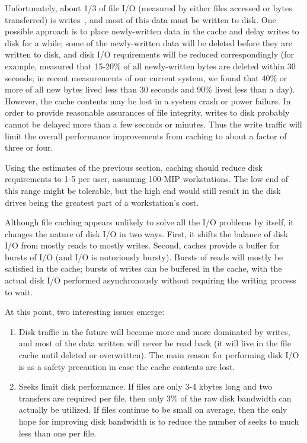 Unfortunately, about 1/3 of file I/O (measured by either files accessed
or bytes transferred) is writes~\cite{ouster:bsd}, and most of this data must
be written to disk.
One possible approach is to place
newly-written data in the cache and delay writes to disk for a while;
some of the newly-written data will be deleted before they are written
to disk, and disk I/O requirements will be reduced correspondingly (for
example, \cite{ouster:bsd} measured that 15-20\% of all newly-written bytes are
deleted within 30 seconds;  in recent measurements of our
current system, we found that 40\% or more of all new bytes lived less
than 30 seconds and 90\% lived less than a day).  However, the cache
contents may
be lost in a system crash or power failure.  In order to provide
reasonable assurances of file integrity, writes to disk probably cannot
be delayed more than a few seconds or minutes.  Thus the write traffic
will limit the overall performance improvements from caching to about
a factor of three or four.

Using the estimates of the previous section, caching should
reduce disk requirements to 1-5 per user, assuming
100-MIP workstations.  The low end of this range might be tolerable,
but the high end would still result in the disk drives being the
greatest part of a workstation's cost.

Although file caching appears unlikely to solve all the I/O
problems by itself, it changes the nature of disk I/O in two
ways.
First, it shifts the balance of disk I/O from mostly reads to mostly
writes.  Second, caches provide a buffer for bursts
of I/O (and I/O is notoriously bursty).  Bursts of reads will mostly be
satisfied in the cache;  bursts of writes can be buffered in the cache,
with the actual disk I/O performed asynchronously without requiring the
writing process to wait.

At this point, two interesting issues emerge:
\begin{enumerate}
\item Disk traffic in the future will become more and more dominated
by writes, and most of the data written will never be read back (it
will live in the file cache until deleted or overwritten).  The main
reason for performing disk I/O is as a safety precaution in case
the cache contents are lost.
\item Seeks limit disk performance.  If files are only 3-4 kbytes long
and two transfers are required per file, then only 3\% of the
raw disk bandwidth can actually be utilized.
If files continue to be small on average, then
the only hope for improving disk bandwidth is to reduce the
number of seeks to much less than one per file.
\end{enumerate}

